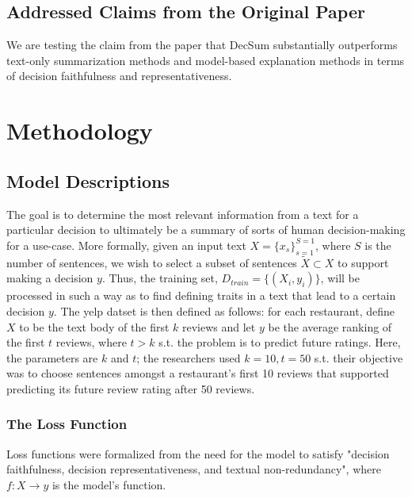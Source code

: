 \documentclass{article}
\begin{document}
\subsection{Addressed Claims from the Original Paper}

We are testing the claim from the paper that DecSum substantially outperforms text-only summarization methods and model-based explanation methods in terms of decision faithfulness and representativeness.

\section{Methodology}

\subsection{Model Descriptions}
The goal is to determine the most relevant information from a text for a particular decision to ultimately be a summary of sorts of human decision-making for a use-case. More formally, given an
input text $X = \{x_s\}_{s=1}^{S=1}$, where $S$ is the number of sentences, we wish to select a subset of sentences $\tilde{X}\subset X$ to support making a decision $y$. Thus, the training set,
$D_{train} = \{(X_i, y_i)\}$, will be processed in such a way as to find defining traits in a text that lead to a certain decision $y$. The yelp datset is then defined as follows: for each restaurant,
define $X$ to be the text body of the first $k$ reviews and let $y$ be the average ranking of the first $t$ reviews, where $t > k$ s.t. the problem is to predict future ratings.
Here, the parameters are $k$ and $t$; the researchers used $k = 10, t = 50$ s.t. their objective was to choose sentences amongst a restaurant’s first 10 reviews that supported predicting its future
review rating after 50 reviews.

\subsubsection{The Loss Function}
Loss functions were formalized from the need for the model to satisfy "decision faithfulness, decision representativeness, and textual non-redundancy", where $f:X\to y$ is the model's function. \\
\end{document}
